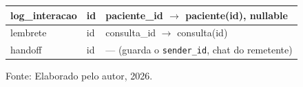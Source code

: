 \documentclass[12pt,a4paper]{extarticle}
\begin{document}
\begin{table}[H]
\begin{tabularx}{\textwidth}{
        >{\raggedright\arraybackslash}p{}
        >{\raggedright\arraybackslash}p{}
        >{\raggedright\arraybackslash}X
    }
        log\_\allowbreak{}interacao
        & id
        & paciente\_\allowbreak{}id $\rightarrow$ paciente(id), nullable \\
        \hline

        lembrete
        & id
        & consulta\_\allowbreak{}id $\rightarrow$ consulta(id) \\
        \hline

        handoff
        & id
        & --- (guarda o \texttt{sender\_\allowbreak{}id}, chat do remetente) \\
        \hline

    \end{tabularx}

    \vspace{0.1cm}

    \footnotesize
    Fonte: Elaborado pelo autor, 2026.
\end{table}
\end{document}
